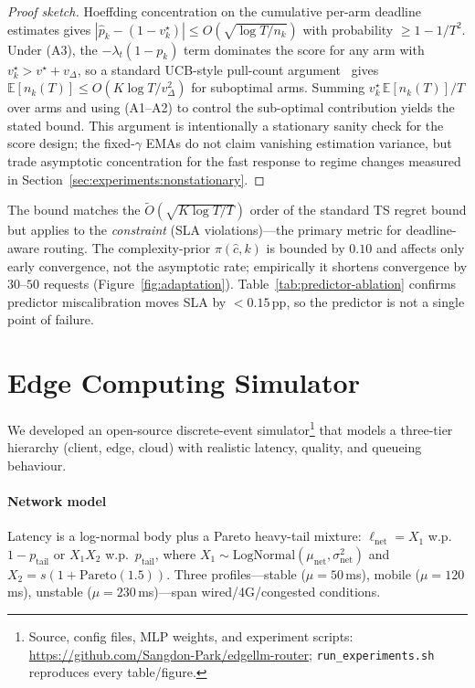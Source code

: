 \documentclass[final,3p,twocolumn,authoryear]{elsarticle}
\theoremstyle{plain}
\theoremstyle{definition}
\begin{document}
\begin{proof}[Proof sketch]
Hoeffding concentration on the cumulative per-arm deadline estimates gives $|\hat{p}_k - (1{-}v_k^\star)|{\leq}O(\sqrt{\log T / n_k})$ with probability $\geq 1-1/T^2$. Under (A3), the $-\lambda_t(1-p_k)$ term dominates the score for any arm with $v_k^\star{>}v^\star{+}v_\Delta$, so a standard UCB-style pull-count argument~\citep{auer2002finite} gives $\mathbb{E}[n_k(T)]\leq O(K\log T/v_\Delta^2)$ for suboptimal arms. Summing $v_k^\star\,\mathbb{E}[n_k(T)]/T$ over arms and using (A1--A2) to control the sub-optimal contribution yields the stated bound. This argument is intentionally a stationary sanity check for the score design; the fixed-$\gamma$ EMAs do not claim vanishing estimation variance, but trade asymptotic concentration for the fast response to regime changes measured in Section~\ref{sec:experiments:nonstationary}.
\end{proof}

The bound matches the $\widetilde{O}(\sqrt{K\log T/T})$ order of the standard TS regret bound but applies to the \emph{constraint} (SLA violations)---the primary metric for deadline-aware routing. The complexity-prior $\pi(\hat{c},k)$ is bounded by $0.10$ and affects only early convergence, not the asymptotic rate; empirically it shortens convergence by $30$--$50$ requests (Figure~\ref{fig:adaptation}). Table~\ref{tab:predictor-ablation} confirms predictor miscalibration moves SLA by $<0.15$\,pp, so the predictor is not a single point of failure.

\section{Edge Computing Simulator}
\label{sec:simulator}

We developed an open-source discrete-event simulator\footnote{Source, config files, MLP weights, and experiment scripts: \url{https://github.com/Sangdon-Park/edgellm-router}; \texttt{run\_experiments.sh} reproduces every table/figure.} that models a three-tier hierarchy (client, edge, cloud) with realistic latency, quality, and queueing behaviour.

\paragraph{Network model}
Latency is a log-normal body plus a Pareto heavy-tail mixture:
$\ell_{\text{net}} = X_1$ w.p.\ $1{-}p_{\text{tail}}$ or $X_1 X_2$ w.p.\ $p_{\text{tail}}$, where $X_1{\sim}\text{LogNormal}(\mu_{\text{net}}, \sigma_{\text{net}}^2)$ and $X_2{=}s(1+\text{Pareto}(1.5))$. Three profiles---stable ($\mu{=}50$\,ms), mobile ($\mu{=}120$\,ms), unstable ($\mu{=}230$\,ms)---span wired/4G/congested conditions.
\end{document}
